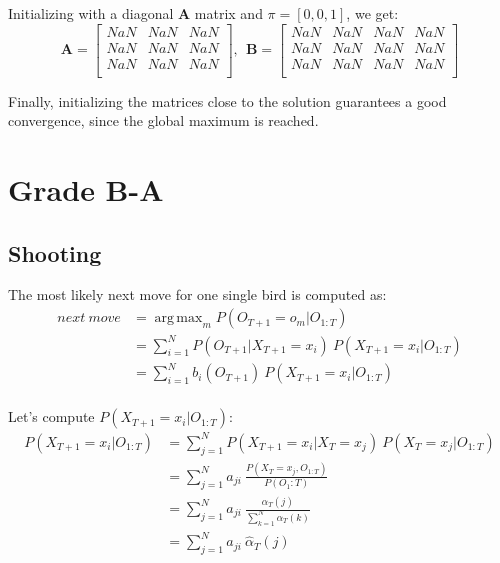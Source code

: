\documentclass{scrartcl}
\DeclareMathOperator*{\argmax}{arg\,max}
\begin{document}
Initializing with a diagonal $\mathbf{A}$ matrix and $\pi = \left[0,0,1\right]$, we get:
\begin{equation}
  \mathbf{A} = 
 \begin{bmatrix}
  NaN & NaN & NaN \\
  NaN & NaN & NaN \\
  NaN & NaN & NaN \\
 \end{bmatrix} 
 ,\ \ \mathbf{B} = 
 \begin{bmatrix}
  NaN & NaN & NaN & NaN \\
  NaN & NaN & NaN & NaN \\
  NaN & NaN & NaN & NaN \\
 \end{bmatrix}
\end{equation}

Finally, initializing the matrices close to the solution guarantees a good convergence, since the global maximum is reached.


\section{Grade B-A}

\subsection{Shooting}

The most likely next move for one single bird is computed as:
\begin{align}
 next\ move &= \argmax_{m} P(O_{T+1}=o_m | O_{1:T}) \nonumber \\
 &= \sum_{i=1}^N P(O_{T+1} | X_{T+1}=x_i)\ P(X_{T+1}=x_i | O_{1:T}) \nonumber \\
 &= \sum_{i=1}^N b_i(O_{T+1})\ P(X_{T+1}=x_i | O_{1:T}) \nonumber \\
\end{align}

Let's compute $P(X_{T+1}=x_i | O_{1:T})$:
\begin{align}
 P(X_{T+1}=x_i | O_{1:T}) &= \sum_{j=1}^N P(X_{T+1}=x_i | X_T=x_j)\ P(X_T=x_j | O_{1:T}) \nonumber \\
 &= \sum_{j=1}^N a_{ji}\ \frac{P(X_T=x_j, O_{1:T})}{P(O_1:T)} \nonumber \\
 &= \sum_{j=1}^N a_{ji}\ \frac{\alpha_T(j)}{\sum_{k=1}^N \alpha_T(k)} \\
 &= \sum_{j=1}^N a_{ji}\ \hat{\alpha}_T(j)
\end{align}
\end{document}
